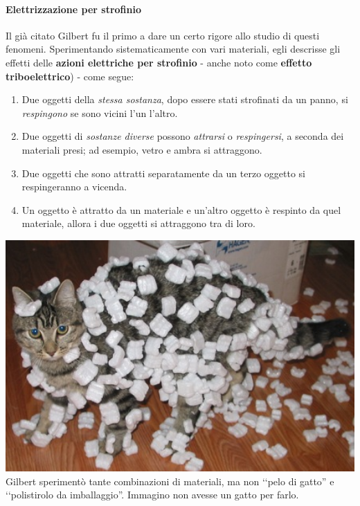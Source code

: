 \paragraph{Elettrizzazione per strofinio}
Il già citato Gilbert fu il primo a dare un certo rigore allo studio di questi fenomeni. Sperimentando sistematicamente con vari materiali, egli descrisse gli effetti delle \textbf{azioni elettriche per strofinio} - anche noto come \textbf{effetto triboelettrico}) - come segue:\\
\begin{minipage}{0.65\textwidth}
\begin{enumerate}[label=\alph*)]
	\item Due oggetti della \textit{stessa sostanza}, dopo essere stati strofinati da un panno, si \textit{respingono} se sono vicini l'un l'altro.
	\item Due oggetti di \textit{sostanze diverse} possono \textit{attrarsi} o \textit{respingersi}, a seconda dei materiali presi; ad esempio, vetro e ambra si attraggono.
	\item Due oggetti che sono attratti separatamente da un terzo oggetto si respingeranno a vicenda.
	\item Un oggetto è attratto da un materiale e un'altro oggetto è respinto da quel materiale, allora i due oggetti si attraggono tra di loro.
\end{enumerate}
\end{minipage}\hspace{10pt}
\begin{minipage}{0.34\textwidth}
		\includegraphics[width=1\textwidth]{images/foamcat.jpg}
	{\scriptsize Gilbert sperimentò tante combinazioni di materiali, ma non ‘‘pelo di gatto'' e ‘‘polistirolo da imballaggio''. Immagino non avesse un gatto per farlo.}
\end{minipage}\vspace{3pt}\\
